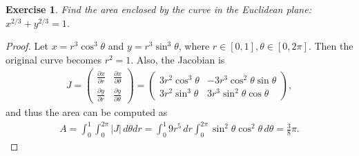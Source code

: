 \documentclass[11pt]{article}
\newtheorem{exercise}{Exercise}[section]
\theoremstyle{definition}
\numberwithin{equation}{subsection}
\begin{document}
\medskip

\begin{exercise}
Find the area enclosed by the curve in the Euclidean plane: $  x^{2/3} + y^{2/3} = 1$.
\end{exercise}
\begin{proof}
Let $x = r^3 \cos^3 \theta$ and $y = r^3 \sin^3 \theta$, where $r \in [0,1], \theta \in [0, 2\pi]$. Then the original curve becomes $r^2 = 1$. Also, the Jacobian is
\begin{align*}
    J = \begin{pmatrix}
          \frac{\partial x}{\partial r} &    \frac{\partial x}{\partial \theta} \\
          \frac{\partial y}{\partial r} &    \frac{\partial y}{\partial \theta}
    \end{pmatrix} =  \begin{pmatrix}
        3r^2 \cos^3 \theta & -3r^3 \cos^2 \theta \sin \theta \\
        3r^2 \sin^3 \theta & 3r^3 \sin^2 \theta \cos \theta 
    \end{pmatrix},
\end{align*}
and thus the area can be computed as
\begin{align*}
    A = \int^1_0 \int^{2\pi}_0 |J|\, d\theta dr = \int^1_0 9r^5\, dr \int^{2\pi}_0 \sin^2 \theta \cos^2 \theta \, d\theta = \frac{3}{8} \pi.
\end{align*}
\end{proof}

\medskip
\end{document}
